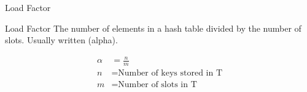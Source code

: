 \begin{frame}{Load Factor}
    \begin{block}{Load Factor}
      \centering
      The number of elements in a hash table divided by the number of slots. Usually written \alpha (alpha).
      
    \end{block}
    
    \begin{block}{}
        \centering
        \begin{align*}
            \alpha & = \frac{n}{m}  \\
            n & = 	\text{Number of keys stored in T} \\
           m & = 	\text{Number of slots in T}
        \end{align*}
    \end{block}  
\end{frame}
